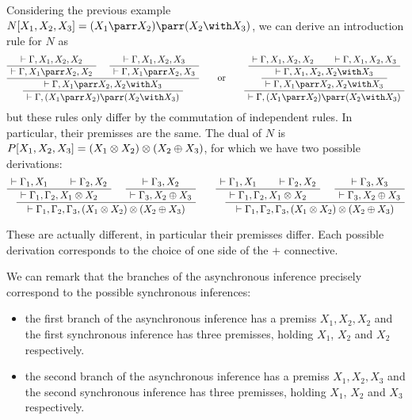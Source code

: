 Considering the previous example
\(N[X_1,X_2,X_3]=(X_1\parr X_2)\parr(X_2\with X_3)\), we can derive an
introduction rule for \(N\) as
\begin{equation*}
\AxRule{ \vdash \Gamma, X_1, X_2, X_2 }
  \UnaRule{ \vdash \Gamma, X_1\parr X_2, X_2 }
  \AxRule{ \vdash \Gamma, X_1, X_2, X_3 }
  \UnaRule{ \vdash \Gamma, X_1\parr X_2, X_3 }
  \BinRule{ \vdash \Gamma, X_1\parr X_2, X_2\with X_3 }
  \UnaRule{ \vdash \Gamma, (X_1\parr X_2)\parr(X_2\with X_3) }
  \DisplayProof
\quad\quad\text{or}\quad\quad
  \AxRule{ \vdash \Gamma, X_1, X_2, X_2 }
  \AxRule{ \vdash \Gamma, X_1, X_2, X_3 }
  \BinRule{ \vdash \Gamma, X_1, X_2, X_2\with X_3 }
  \UnaRule{ \vdash \Gamma, X_1\parr X_2, X_2\with X_3 }
  \UnaRule{ \vdash \Gamma, (X_1\parr X_2)\parr(X_2\with X_3) }
  \DisplayProof
\end{equation*}
but these rules only differ by the commutation of independent rules. In
particular, their premisses are the same. The dual of \(N\) is
\(P[X_1,X_2,X_3]=(X_1\otimes X_2)\otimes(X_2\oplus X_3)\), for which we have
two possible derivations:
\begin{equation*}
  \AxRule{ \vdash \Gamma_1, X_1 }
  \AxRule{ \vdash \Gamma_2, X_2 }
  \BinRule{ \vdash \Gamma_1, \Gamma_2, X_1\tens X_2 }
  \AxRule{ \vdash \Gamma_3, X_2 }
  \UnaRule{ \vdash \Gamma_3, X_2\plus X_3 }
  \BinRule{ \vdash \Gamma_1, \Gamma_2, \Gamma_3, (X_1\tens X_2)\tens(X_2\plus X_3) }
  \DisplayProof
\qquad
  \AxRule{ \vdash \Gamma_1, X_1 }
  \AxRule{ \vdash \Gamma_2, X_2 }
  \BinRule{ \vdash \Gamma_1, \Gamma_2, X_1\tens X_2 }
  \AxRule{ \vdash \Gamma_3, X_3 }
  \UnaRule{ \vdash \Gamma_3, X_2\plus X_3 }
  \BinRule{ \vdash \Gamma_1, \Gamma_2, \Gamma_3, (X_1\tens X_2)\tens(X_2\plus X_3) }
  \DisplayProof
\end{equation*}

These are actually different, in particular their premisses differ. Each
possible derivation corresponds to the choice of one side of the
\(\plus\) connective.

We can remark that the branches of the asynchronous inference precisely
correspond to the possible synchronous inferences:
\begin{itemize}
\item
  the first branch of the asynchronous inference has a premiss
  \(X_1,X_2,X_2\) and the first synchronous inference has three premisses,
  holding \(X_1\), \(X_2\) and \(X_2\) respectively.
\item
  the second branch of the asynchronous inference has a premiss
  \(X_1,X_2,X_3\) and the second synchronous inference has three premisses,
  holding \(X_1\), \(X_2\) and \(X_3\) respectively.
\end{itemize}

